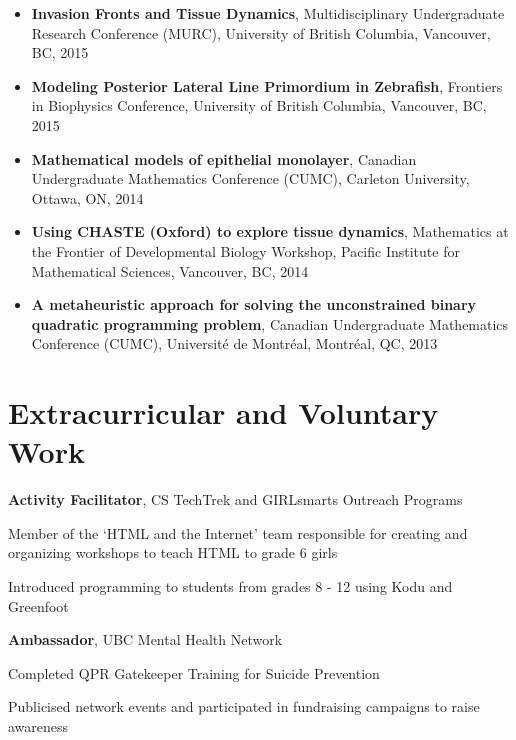 \documentclass[margin,line]{res}
\newenvironment{list3}{
  \begin{list}{\textopenbullet}{
      \setlength{\itemsep}{0in}
      \setlength{\parsep}{0in} \setlength{\parskip}{0in}
      \setlength{\topsep}{0in} \setlength{\partopsep}{0in} 
      \setlength{\leftmargin}{0.1in}}}{\end{list}}
\begin{document}
\begin{resume}
{\renewcommand\leftmargini{0em}
\begin{itemize}
\item {\bf Invasion Fronts and Tissue Dynamics}, Multidisciplinary Undergraduate Research Conference (MURC), University of British Columbia, Vancouver, BC, 2015
\vspace*{.1cm}
\item {\bf Modeling Posterior Lateral Line Primordium in Zebrafish}, Frontiers in Biophysics Conference, University of British Columbia, Vancouver, BC, 2015
\vspace*{.1cm}
\item {\bf Mathematical models of epithelial monolayer}, Canadian Undergraduate Mathematics Conference (CUMC), Carleton University, Ottawa, ON, 2014
\vspace*{.1cm}
\item {\bf Using CHASTE (Oxford) to explore tissue dynamics}, Mathematics at the Frontier of Developmental Biology Workshop, Pacific Institute for Mathematical Sciences, Vancouver, BC, 2014
\item {\bf A metaheuristic approach for solving the unconstrained binary quadratic programming problem}, Canadian Undergraduate Mathematics Conference (CUMC), Universit\'e de Montr\'eal, Montr\'eal, QC, 2013
\end{itemize}
}

\vspace*{.1cm}

\section{\sc Extracurricular and Voluntary Work}

{\bf Activity Facilitator}, CS TechTrek and GIRLsmarts Outreach Programs\\
\vspace*{-.3cm}
\begin{list3}
\item Member of the `HTML and the Internet' team responsible for creating and organizing workshops to teach HTML to grade 6 girls
\item Introduced programming to students from grades 8 - 12 using Kodu and Greenfoot
\end{list3}
\vspace*{.05cm}

{\bf Ambassador}, UBC Mental Health Network\\
\vspace*{-.3cm}
\begin{list3}
\item Completed QPR Gatekeeper Training for Suicide Prevention
\item Publicised network events and participated in fundraising campaigns to raise awareness
\end{list3}
\vspace*{.05cm}


\end{resume}
\end{document}
